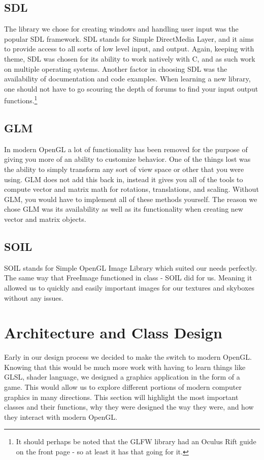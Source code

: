\documentclass[paper=a4, fontsize=11pt]{scrartcl}
\numberwithin{equation}{section}		%
\numberwithin{figure}{section}			%
\numberwithin{table}{section}				%
\begin{document}
\subsection{SDL}
The library we chose for creating windows and handling user input was the popular SDL framework. SDL stands for Simple DirectMedia Layer, and it aims to provide access to all sorts of low level input, and output. Again, keeping with theme, SDL was chosen for its ability to work natively with C, and as such work on multiple operating systems. Another factor in choosing SDL was the availability of documentation and code examples. When learning a new library, one should not have to go scouring the depth of forums to find your input output functions.\footnote{It should perhaps be noted that the GLFW library had an Oculus Rift guide on the front page - so at least it has that going for it.}
\subsection{GLM}
In modern OpenGL a lot of functionality has been removed for the purpose of giving you more of an ability to customize behavior. One of the things lost was the ability to simply transform any sort of view space or other that you were using. GLM does not add this back in, instead it gives you all of the tools to compute vector and matrix math for rotations, translations, and scaling. Without GLM, you would have to implement all of these methods yourself. The reason we chose GLM was its availability as well as its functionality when creating new vector and matrix objects.
\subsection{SOIL}
SOIL stands for Simple OpenGL Image Library which suited our needs perfectly. The same way that FreeImage functioned in class - SOIL did for us. Meaning it allowed us to quickly and easily important images for our textures and skyboxes without any issues.

\section{Architecture and Class Design}
Early in our design process we decided to make the switch to modern OpenGL. Knowing that this would be much more work with having to learn things like GLSL, shader language, we designed a graphics application in the form of a game. This would allow us to explore different portions of modern computer graphics in many directions. This section will highlight the most important classes and their functions, why they were designed the way they were, and how they interact with modern OpenGL.
\end{document}
